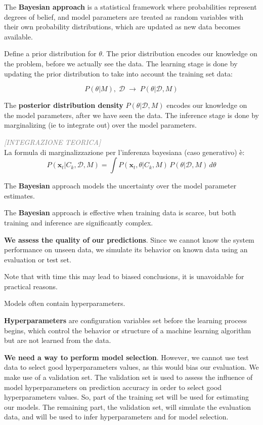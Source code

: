 The \textbf{Bayesian approach} is a statistical framework where probabilities represent degrees of belief, and model parameters are treated as random variables with their own probability distributions, which are updated as new data becomes available.

Define a prior distribution for $\theta$. The prior distribution encodes our knowledge on the problem, before we actually see the data. The learning stage is done by updating the prior distribution to take into account the training set data:

\begin{equation*}
P(\theta|M),\; \mathcal{D} \;\longrightarrow\; P(\theta|\mathcal{D}, M)
\end{equation*}

The \textbf{posterior distribution density} $P(\theta|\mathcal{D}, M)$ encodes our knowledge on the model parameters, after we have seen the data. The inference stage is done by marginalizing (ie to integrate out) over the model parameters.

\begin{tcolorbox}[colframe=blue!70!black, colback=white, sharp corners=southwest, left=2mm, boxrule=1pt, enhanced, breakable]
\textcolor{gray}{\footnotesize\textit{[INTEGRAZIONE TEORICA]}}\\
La formula di marginalizzazione per l'inferenza bayesiana (caso generativo) è:
\begin{equation*}
P(\mathbf{x}_t|C_k, \mathcal{D}, M) = \int P(\mathbf{x}_t, \theta|C_k, M)\,P(\theta|\mathcal{D}, M)\,d\theta
\end{equation*}
\end{tcolorbox}

The \textbf{Bayesian} approach models the uncertainty over the model parameter estimates.

The \textbf{Bayesian} approach is effective when training data is scarce, but both training and inference are significantly complex.

\textbf{We assess the quality of our predictions}. Since we cannot know the system performance on unseen data, we simulate its behavior on known data using an evaluation or test set.

Note that with time this may lead to biased conclusions, it is unavoidable for practical reasons.

Models often contain hyperparameters.

\textbf{Hyperparameters} are configuration variables set before the learning process begins, which control the behavior or structure of a machine learning algorithm but are not learned from the data.

\textbf{We need a way to perform model selection}. However, we cannot use test data to select good hyperparameters values, as this would bias our evaluation. We make use of a validation set. The validation set is used to assess the influence of model hyperparameters on prediction accuracy in order to select good hyperparameters values. So, part of the training set will be used for estimating our models. The remaining part, the validation set, will simulate the evaluation data, and will be used to infer hyperparameters and for model selection.

